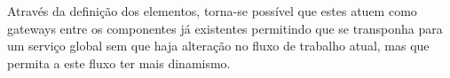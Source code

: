 \documentclass[conference]{IEEEtran}
\begin{document}
Através da definição dos elementos, torna-se possível que estes atuem como gateways entre os componentes já existentes permitindo que se transponha para um serviço global sem que haja alteração no fluxo de trabalho atual, mas que permita a este fluxo ter mais dinamismo.

\addtolength{\textheight}{-12cm}   %


  

\end{document}

